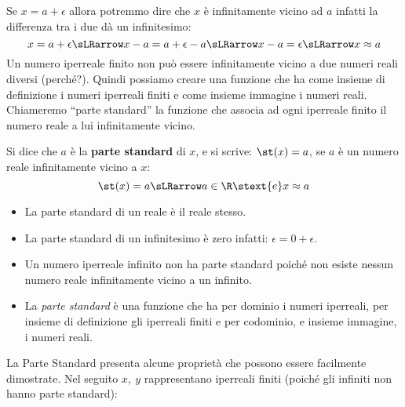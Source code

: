 Se \(x=a+\epsilon\) allora potremmo dire che \(x\) è infinitamente vicino 
ad \(a\) infatti la differenza tra i due dà un infinitesimo: 
\[x=a+\epsilon \sLRarrow
x-a = a+\epsilon-a \sLRarrow x-a = \epsilon \sLRarrow x \approx a\]
Un numero iperreale finito non può essere infinitamente vicino 
a due numeri reali diversi (perché?).
Quindi possiamo creare una funzione che ha come insieme di definizione 
i numeri iperreali finiti e come insieme immagine i numeri reali.
Chiameremo ``parte standard'' la funzione che associa ad ogni 
iperreale finito il numero reale a lui infinitamente vicino.

% 

\begin{definizione}
 Si dice che \(a\) è la \textbf{parte standard} di \(x\), e si scrive: 
 \(\st(x) = a\), se \(a\) è un numero reale infinitamente vicino a \(x\):
\[\st(x) = a \sLRarrow a \in \R \stext{e} x \approx a\]
\end{definizione}
\begin{osservazione}
\begin{itemize} [nosep]
 \item 
La parte standard di un reale è il reale stesso.
 \item 
La parte standard di un infinitesimo è zero infatti:
\(\epsilon = 0+\epsilon\).
 \item 
Un numero iperreale infinito non ha parte standard poiché non esiste nessun 
numero reale infinitamente vicino a un infinito.
 \item 
La \emph{parte standard} è una funzione che ha per dominio i numeri 
iperreali, per insieme di definizione gli iperreali finiti e per codominio, 
e insieme immagine, i numeri reali.
\end{itemize}
\end{osservazione}
\vspace{1em}
La Parte Standard presenta alcune proprietà che possono essere facilmente 
dimostrate. Nel seguito \(x,\ y\) rappresentano iperreali finiti 
(poiché gli infiniti non hanno parte standard):

